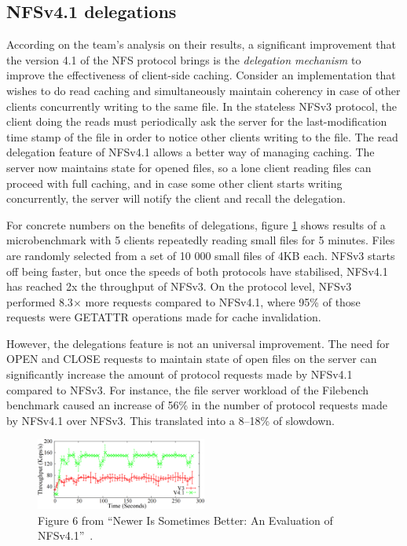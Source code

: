 \subsection{NFSv4.1 delegations}
According on the team's analysis on their results, a significant improvement that the version 4.1 of the NFS protocol brings is the \emph{delegation
mechanism} to improve the effectiveness of client-side caching.
Consider an implementation that wishes to do read caching and simultaneously maintain coherency in case of other clients
concurrently writing to the same file.
In the stateless NFSv3 protocol, the client doing the reads must periodically ask the server for the last-modification time stamp of the file in order to notice other clients writing to the file.
The read delegation feature of NFSv4.1 allows a better way of managing caching.
The server now maintains state for opened files, so a lone client reading files can proceed with full caching,
and in case some other client starts writing concurrently, the server will notify the client and recall the delegation.

For concrete numbers on the benefits of delegations,
figure \ref{fig:nfsv41randread} shows results of a microbenchmark with 5 clients repeatedly reading small files for 5 minutes.
Files are randomly selected from a set of 10 000 small files of 4KB each.
NFSv3 starts off being faster, but once the speeds of both protocols have stabilised,
NFSv4.1 has reached 2x the throughput of NFSv3.
On the protocol level, NFSv3 performed 8.3$\times$ more requests compared to NFSv4.1,
where 95\% of those requests were GETATTR operations made for cache invalidation.

However, the delegations feature is not an universal improvement.
The need for OPEN and CLOSE requests to maintain state of open files on the server can significantly increase the amount of protocol requests made by NFSv4.1 compared to NFSv3.
For instance, the file server workload of the Filebench benchmark caused an increase of 56\% in the number of protocol requests made by NFSv4.1 over NFSv3.
This translated into a 8--18\% of slowdown.

\begin{figure}[h]
\centering\includegraphics[width=0.5\textwidth]{images/nfsv41better-reading-small-files.png}
\caption{Figure 6 from ``Newer Is Sometimes Better: An Evaluation of NFSv4.1''~\cite{NFSv4Better}.}
\label{fig:nfsv41randread}
\end{figure}

